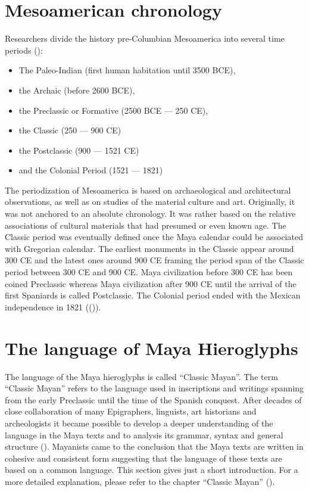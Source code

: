\documentclass[../main.tex]{subfiles}
\begin{document}
\section{Mesoamerican chronology}
Researchers divide the history pre-Columbian Mesoamerica into several time periods 
(\cite{mendoza2001}):

\begin{itemize}
    \item The Paleo-Indian (first human habitation until 3500 BCE),
    \item the Archaic (before 2600 BCE),
    \item the Preclassic or Formative (2500 BCE --- 250 CE),
    \item the Classic (250 --- 900 CE)
    \item the Postclassic (900 --- 1521 CE)
    \item and the Colonial Period (1521 --- 1821)
\end{itemize}
The periodization of Mesoamerica is based on archaeological and architectural observations,
as well as on studies of the material culture and art.
Originally, it was not anchored to an absolute chronology.
It was rather based on the relative associations of cultural materials that had presumed or 
even known age.
The Classic period was eventually defined once the Maya calendar could be associated 
with Gregorian calendar.
The earliest monuments in the Classic appear around 300 CE and the latest ones around 900 CE framing
the period span of the Classic period between 300 CE and 900 CE\@.
Maya civilization before 300 CE has been coined Preclassic whereas Maya civilization
after 900 CE until the arrival of the first Spaniards is called Postclassic.
The Colonial period ended with the Mexican independence in 1821 ((\cite{mendoza2001})).

\section{The language of Maya Hieroglyphs}
The language of the Maya hieroglyphs is called ``Classic Mayan''.
The term ``Classic Mayan'' refers to the language used in inscriptions and writings
spanning from the early Preclassic until the time of the Spanish conquest.
After decades of close collaboration of many Epigraphers, linguists, art historians and 
archeologists it became possible to develop a deeper understanding of the language in the Maya 
texts and to analysis its grammar, syntax and general structure (\cite{lawstuart2017}).
Mayanists came to the conclusion that the Maya texts are written in
cohesive and consistent form suggesting that the language of these texts are based on
a common language.
This section gives just a short introduction.
For a more detailed explanation, please refer to the chapter ``Classic Mayan'' 
().
\end{document}
